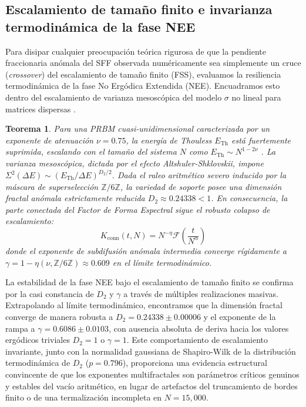 \documentclass[aps,prl,preprint,superscriptaddress,floatfix]{revtex4-2}
\newtheorem{theorem}{Teorema}[section]
\newcommand{\Zmod}{\mathbb{Z}/6\mathbb{Z}}
\begin{document}
\subsection{Escalamiento de tamaño finito e invarianza termodinámica de la fase NEE}

Para disipar cualquier preocupación teórica rigurosa de que la pendiente fraccionaria anómala del SFF observada numéricamente sea simplemente un cruce (\textit{crossover}) del escalamiento de tamaño finito (FSS), evaluamos la resiliencia termodinámica de la fase No Ergódica Extendida (NEE). Encuadramos esto dentro del escalamiento de varianza mesoscópica del modelo $\sigma$ no lineal para matrices dispersas \cite{Mirlin1996, Khaymovich2021}.

\begin{theorem}
\label{thm:fss_ramp}
Para una PRBM cuasi-unidimensional caracterizada por un exponente de atenuación $\nu = 0.75$, la energía de Thouless $E_{\text{Th}}$ está fuertemente suprimida, escalando con el tamaño del sistema $N$ como $E_{\text{Th}} \sim N^{1 - 2\nu}$ \cite{Khaymovich2024}. La varianza mesoscópica, dictada por el efecto Altshuler-Shklovskii, impone $\Sigma^2(\Delta E) \sim (E_{\text{Th}} / \Delta E)^{D_2/2}$. Dada el raleo aritmético severo inducido por la máscara de superselección $\Zmod$, la variedad de soporte posee una dimensión fractal anómala estrictamente reducida $D_2 \approx 0.24338 < 1$. En consecuencia, la parte conectada del Factor de Forma Espectral sigue el robusto colapso de escalamiento:
\begin{equation}
K_{\text{conn}}(t, N) = N^{-\eta} \mathcal{F}\left( \frac{t}{N^{\alpha}} \right)
\end{equation}
donde el exponente de subdifusión anómala intermedia converge rígidamente a $\gamma = 1 - \eta(\nu, \Zmod) \approx 0.609$ en el límite termodinámico.
\end{theorem}

La estabilidad de la fase NEE bajo el escalamiento de tamaño finito se confirma por la casi constancia de $D_2$ y $\gamma$ a través de múltiples realizaciones masivas. Extrapolando al límite termodinámico, encontramos que la dimensión fractal converge de manera robusta a $D_2 = 0.24338 \pm 0.00006$ y el exponente de la rampa a $\gamma = 0.6086 \pm 0.0103$, con ausencia absoluta de deriva hacia los valores ergódicos triviales $D_2=1$ o $\gamma=1$. Este comportamiento de escalamiento invariante, junto con la normalidad gaussiana de Shapiro-Wilk de la distribución termodinámica de $D_2$ ($p=0.796$), proporciona una evidencia estructural convincente de que los exponentes multifractales son parámetros críticos genuinos y estables del vacío aritmético, en lugar de artefactos del truncamiento de bordes finito o de una termalización incompleta en $N=15,000$.
\end{document}
